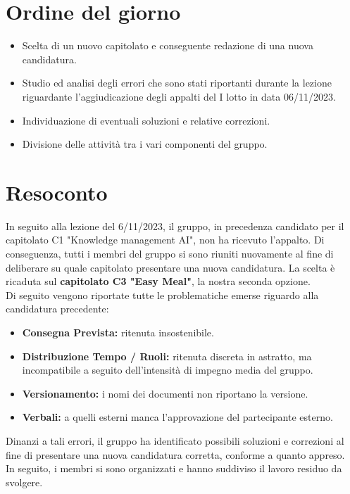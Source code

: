 \section{Ordine del giorno}
\begin{itemize}
    \item Scelta di un nuovo capitolato e conseguente redazione di una nuova candidatura.
    \item Studio ed analisi degli errori che sono stati riportanti durante la lezione riguardante l'aggiudicazione degli appalti del I lotto in data 06/11/2023. 
	\item Individuazione di eventuali soluzioni e relative correzioni.
	\item Divisione delle attività tra i vari componenti del gruppo.
\end{itemize}

\section{Resoconto}
In seguito alla lezione del 6/11/2023, il gruppo, in precedenza candidato per il capitolato C1 "Knowledge management AI", non ha ricevuto l'appalto. Di conseguenza, tutti i membri del gruppo si sono riuniti nuovamente al fine di deliberare su quale capitolato presentare una nuova candidatura. La scelta è ricaduta sul \textbf{capitolato C3 "Easy Meal"}, la nostra seconda opzione. \\

\noindent
Di seguito vengono riportate tutte le problematiche emerse riguardo alla candidatura precedente:
\begin{itemize}
    \item \textbf{Consegna Prevista:} ritenuta insostenibile.
    \item \textbf{Distribuzione Tempo / Ruoli:} ritenuta discreta in astratto, ma incompatibile a seguito dell'intensità di impegno media del gruppo.
    \item \textbf{Versionamento:} i nomi dei documenti non riportano la versione.
    \item \textbf{Verbali:} a quelli esterni manca l'approvazione del partecipante esterno.
\end{itemize}

\noindent
 Dinanzi a tali errori, il gruppo ha identificato possibili soluzioni e correzioni al fine di presentare una nuova candidatura corretta, conforme a quanto appreso.\\
 In seguito, i membri si sono organizzati e hanno suddiviso il lavoro residuo da svolgere.

